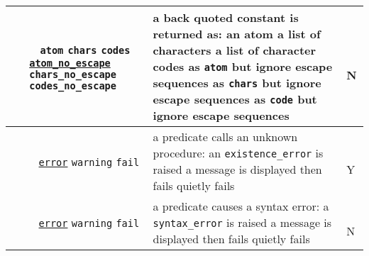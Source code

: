 \begin{tabular}{|L{4.5cm}|C{2.8cm}|L{6.2cm}|C{0,6cm}|}
\hline

~
\linebreak
{} &
  ~
\linebreak
  \texttt{atom}
\linebreak
  \texttt{chars}
\linebreak
  \texttt{codes}
\linebreak
  \texttt{\underline{atom\_no\_escape}}
\linebreak
  \texttt{chars\_no\_escape}
\linebreak
  \texttt{codes\_no\_escape} &
    a back quoted constant is returned as:
\linebreak
    an atom
\linebreak
    a list of characters
\linebreak
    a list of character codes
\linebreak
    as \texttt{atom} but ignore escape sequences
\linebreak
    as \texttt{chars} but ignore escape sequences
\linebreak
    as \texttt{code} but ignore escape sequences &
      ~
\linebreak
      N
 \\
\hline

~
\linebreak
{} &
  ~
\linebreak
  \texttt{\underline{error}}
\linebreak
  \texttt{warning}
\linebreak
  \texttt{fail} &
    a predicate calls an unknown procedure:
\linebreak
    an \texttt{existence\_error} is raised
\linebreak
    a message is displayed then fails
\linebreak
    quietly fails &
      ~
\linebreak
      Y \\

\hline

~
\linebreak
{} &
  ~
\linebreak
  \texttt{\underline{error}}
\linebreak
  \texttt{warning}
\linebreak
  \texttt{fail} &
    a predicate causes a syntax error:
\linebreak
    a \texttt{syntax\_error} is raised
\linebreak
    a message is displayed then fails
\linebreak
    quietly fails &
      ~
\linebreak
      N \\


\end{tabular}
